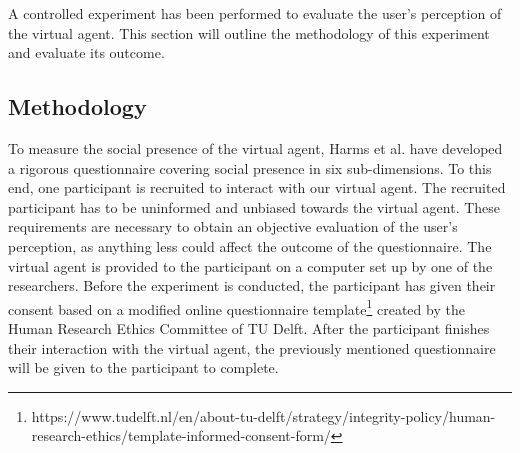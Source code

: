 A controlled experiment has been performed to evaluate the user's perception of the virtual agent. This section will outline the methodology of this experiment and evaluate its outcome.

\subsection{Methodology}
\noindent 
To measure the social presence of the virtual agent, Harms et al. \cite{Alcaiz2004InternalCA} have developed a rigorous questionnaire covering social presence in six sub-dimensions.
To this end, one participant is recruited to interact with our virtual agent. The recruited participant has to be uninformed and unbiased towards the virtual agent. These requirements are necessary to obtain an objective evaluation of the user's perception, as anything less could affect the outcome of the questionnaire.
The virtual agent is provided to the participant on a computer set up by one of the researchers. Before the experiment is conducted, the participant has given their consent based on a modified online questionnaire template\footnote{https://www.tudelft.nl/en/about-tu-delft/strategy/integrity-policy/human-research-ethics/template-informed-consent-form/} created by the Human Research Ethics Committee of TU Delft.
After the participant finishes their interaction with the virtual agent, the previously mentioned questionnaire will be given to the participant to complete.



